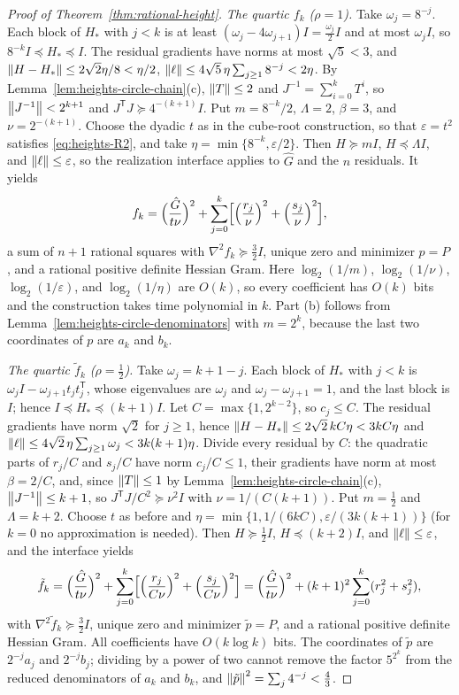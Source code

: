 \begin{proof}[Proof of Theorem~\ref{thm:rational-height}]
\emph{The quartic $f_k$ ($\rho=1$).} Take $\omega_j=8^{-j}$. Each block of
$H_*$ with $j<k$ is at least $(\omega_j-4\omega_{j+1})I=\frac{\omega_j}2I$
and at most $\omega_jI$, so $8^{-k}I\preceq H_*\preceq I$. The residual
gradients have norms at most $\sqrt5<3$, and
$\left\lVert H-H_*\right\rVert\le2\sqrt2\eta/8<\eta/2$,
$\left\lVert\ell\right\rVert\le4\sqrt5\,\eta\sum_{j\ge1}8^{-j}<2\eta$. By
Lemma~\ref{lem:heights-circle-chain}(c), $\left\lVert T\right\rVert\le2$ and
$J^{-1}=\sum_{i=0}^kT^i$, so $\left\lVert J^{-1}\right\rVert<2^{k+1}$ and
$J^{\mathsf T}J\succeq4^{-(k+1)}I$. Put $m=8^{-k}/2$, $\Lambda=2$, $\beta=3$, and
$\nu=2^{-(k+1)}$. Choose the dyadic $t$ as in the
cube-root construction, so that $\varepsilon=t^2$ satisfies
\eqref{eq:heights-R2}, and take $\eta=\min\{8^{-k},\varepsilon/2\}$. Then
$H\succeq mI$, $H\preceq\Lambda I$, and $\left\lVert\ell\right\rVert\le\varepsilon$, so the
realization interface applies to $\hat G$ and the $n$ residuals. It yields
\[
 f_k=\Bigl(\frac{\hat G}{t\nu}\Bigr)^2
     +\sum_{j=0}^k\Bigl[\Bigl(\frac{r_j}\nu\Bigr)^2+\Bigl(\frac{s_j}\nu\Bigr)^2\Bigr],
\]
a sum of $n+1$ rational squares with $\nabla^2f_k\succeq\frac32I$, unique
zero and minimizer $p=P$, and a rational positive definite Hessian Gram.
Here $\log_2(1/m)$, $\log_2(1/\nu)$, $\log_2(1/\varepsilon)$, and
$\log_2(1/\eta)$ are $O(k)$, so every coefficient has $O(k)$ bits and the
construction takes time polynomial in $k$. Part (b) follows from
Lemma~\ref{lem:heights-circle-denominators} with $m=2^k$, because the
last two coordinates of $p$ are $a_k$ and $b_k$.

\emph{The quartic $\tilde f_k$ ($\rho=\frac12$).} Take $\omega_j=k+1-j$. Each
block of $H_*$ with $j<k$ is $\omega_jI-\omega_{j+1}t_jt_j^{\mathsf T}$, whose
eigenvalues are $\omega_j$ and $\omega_j-\omega_{j+1}=1$, and the last block
is $I$; hence $I\preceq H_*\preceq(k+1)I$. Let $C=\max\{1,2^{k-2}\}$, so
$c_j\le C$. The residual gradients have norm $\sqrt2$ for $j\ge1$, hence
$\left\lVert H-H_*\right\rVert\le2\sqrt2\,kC\eta<3kC\eta$ and
$\left\lVert\ell\right\rVert\le4\sqrt2\,\eta\sum_{j\ge1}\omega_j<3k(k+1)\eta$. Divide every
residual by $C$: the quadratic parts of $r_j/C$ and $s_j/C$ have norm
$c_j/C\le1$, their gradients have norm at most $\beta=2/C$, and, since
$\left\lVert T\right\rVert\le1$ by Lemma~\ref{lem:heights-circle-chain}(c),
$\left\lVert J^{-1}\right\rVert\le k+1$, so $J^{\mathsf T}J/C^2\succeq\nu^2I$ with
$\nu=1/(C(k+1))$. Put $m=\frac12$ and $\Lambda=k+2$. Choose $t$ as before
and $\eta=\min\{1,1/(6kC),\varepsilon/(3k(k+1))\}$ (for $k=0$ no
approximation is needed). Then $H\succeq\frac12I$, $H\preceq(k+2)I$, and
$\left\lVert\ell\right\rVert\le\varepsilon$, and the interface yields
\[
 \tilde f_k=\Bigl(\frac{\hat G}{t\nu}\Bigr)^2
   +\sum_{j=0}^k\Bigl[\Bigl(\frac{r_j}{C\nu}\Bigr)^2
     +\Bigl(\frac{s_j}{C\nu}\Bigr)^2\Bigr]
 =\Bigl(\frac{\hat G}{t\nu}\Bigr)^2+(k+1)^2\sum_{j=0}^k(r_j^2+s_j^2),
\]
with $\nabla^2\tilde f_k\succeq\frac32I$, unique zero and minimizer
$\tilde p=P$, and a rational positive definite Hessian Gram. All
coefficients have $O(k\log k)$ bits. The coordinates of $\tilde p$ are
$2^{-j}a_j$ and $2^{-j}b_j$; dividing by a power of two cannot remove the
factor $5^{2^k}$ from the reduced denominators of $a_k$ and $b_k$, and
$\left\lVert\tilde p\right\rVert^2=\sum_j4^{-j}<\frac43$.


\end{proof}
